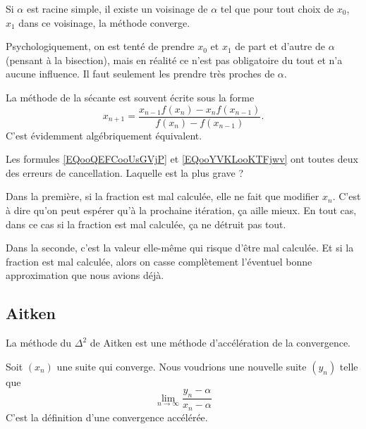 \begin{proposition}
    Si \( \alpha\) est racine simple, il existe un voisinage de \( \alpha\) tel que pour tout choix de \( x_0\), \( x_1\) dans ce voisinage, la méthode converge.
\end{proposition}

Psychologiquement, on est tenté de prendre \( x_0\) et \( x_1\) de part et d'autre de \( \alpha\) (pensant à la bisection), mais en réalité ce n'est pas obligatoire du tout et n'a aucune influence. Il faut seulement les prendre très proches de \( \alpha\).

\begin{remark}
    La méthode de la sécante est souvent écrite sous la forme
    \begin{equation}        \label{EQooYVKLooKTFjwv}
        x_{n+1}=\frac{ x_{n-1}f(x_n)-x_nf(x_{n-1}) }{ f(x_n)-f(x_{n-1}) }.
    \end{equation}
    C'est évidemment algébriquement équivalent.

    Les formules \eqref{EQooQEFCooUsGVjP} et \eqref{EQooYVKLooKTFjwv} ont toutes deux des erreurs de cancellation. Laquelle est la plus grave ?

    Dans la première, si la fraction est mal calculée, elle ne fait que modifier \( x_n\). C'est à dire qu'on peut espérer qu'à la prochaine itération, ça aille mieux. En tout cas, dans ce cas si la fraction est mal calculée, ça ne détruit pas tout.

    Dans la seconde, c'est la valeur elle-même qui risque d'être mal calculée. Et si la fraction est mal calculée, alors on casse complètement l'éventuel bonne approximation que nous avions déjà.
\end{remark}

\subsection{Aitken}

La méthode du \( \Delta^2\) de Aitken est une méthode d'accélération de la convergence.

Soit \( (x_n)\) une suite qui converge. Nous voudrions une nouvelle suite \( (y_n)\) telle que
\begin{equation}
    \lim_{n\to \infty} \frac{ y_n-\alpha }{ x_n-\alpha }
\end{equation}
C'est la définition d'une convergence accélérée.

